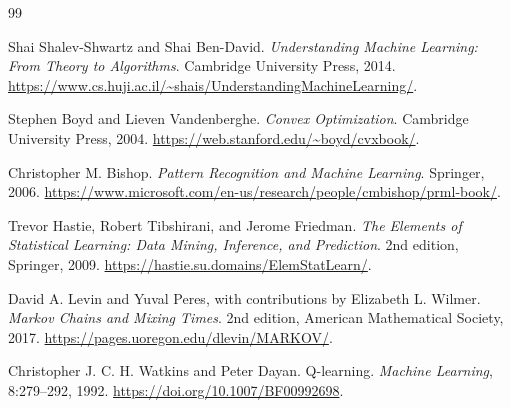 \documentclass[UTF8,12pt,a4paper,fontset=fandol]{ctexbook}
\begin{document}



\backmatter
\begin{thebibliography}{99}

Shai Shalev-Shwartz and Shai Ben-David.
\textit{Understanding Machine Learning: From Theory to Algorithms}.
Cambridge University Press, 2014.
\url{https://www.cs.huji.ac.il/~shais/UnderstandingMachineLearning/}.

Stephen Boyd and Lieven Vandenberghe.
\textit{Convex Optimization}.
Cambridge University Press, 2004.
\url{https://web.stanford.edu/~boyd/cvxbook/}.

Christopher M. Bishop.
\textit{Pattern Recognition and Machine Learning}.
Springer, 2006.
\url{https://www.microsoft.com/en-us/research/people/cmbishop/prml-book/}.

Trevor Hastie, Robert Tibshirani, and Jerome Friedman.
\textit{The Elements of Statistical Learning: Data Mining, Inference, and Prediction}.
2nd edition, Springer, 2009.
\url{https://hastie.su.domains/ElemStatLearn/}.

David A. Levin and Yuval Peres, with contributions by Elizabeth L. Wilmer.
\textit{Markov Chains and Mixing Times}.
2nd edition, American Mathematical Society, 2017.
\url{https://pages.uoregon.edu/dlevin/MARKOV/}.

Christopher J. C. H. Watkins and Peter Dayan.
Q-learning.
\textit{Machine Learning}, 8:279--292, 1992.
\url{https://doi.org/10.1007/BF00992698}.

\end{thebibliography}
\end{document}
